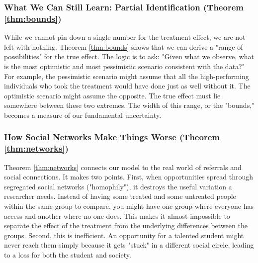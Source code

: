 \subsubsection{What We Can Still Learn: Partial Identification (Theorem \ref{thm:bounds})}
While we cannot pin down a single number for the treatment effect, we are not left with nothing. Theorem \ref{thm:bounds} shows that we can derive a "range of possibilities" for the true effect. The logic is to ask: "Given what we observe, what is the most optimistic and most pessimistic scenario consistent with the data?" For example, the pessimistic scenario might assume that all the high-performing individuals who took the treatment would have done just as well without it. The optimistic scenario might assume the opposite. The true effect must lie somewhere between these two extremes. The width of this range, or the "bounds," becomes a measure of our fundamental uncertainty.

\subsubsection{How Social Networks Make Things Worse (Theorem \ref{thm:networks})}
Theorem \ref{thm:networks} connects our model to the real world of referrals and social connections. It makes two points. First, when opportunities spread through segregated social networks ("homophily"), it destroys the useful variation a researcher needs. Instead of having some treated and some untreated people within the same group to compare, you might have one group where everyone has access and another where no one does. This makes it almost impossible to separate the effect of the treatment from the underlying differences between the groups. Second, this is inefficient. An opportunity for a talented student might never reach them simply because it gets "stuck" in a different social circle, leading to a loss for both the student and society.